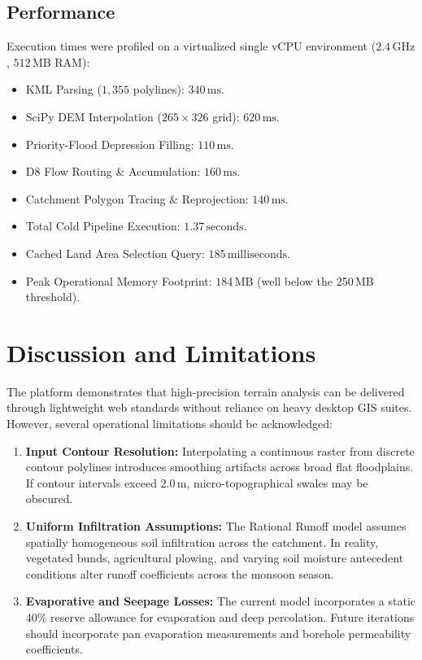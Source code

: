 \documentclass[manuscript,screen,review]{acmart}
\begin{document}
\subsection{Performance}
Execution times were profiled on a virtualized single vCPU environment ($2.4\,\text{GHz}$, $512\,\text{MB}$ RAM):
\begin{itemize}
    \item KML Parsing ($1,355$ polylines): $340\,\text{ms}$.
    \item SciPy DEM Interpolation ($265 \times 326$ grid): $620\,\text{ms}$.
    \item Priority-Flood Depression Filling: $110\,\text{ms}$.
    \item D8 Flow Routing \& Accumulation: $160\,\text{ms}$.
    \item Catchment Polygon Tracing \& Reprojection: $140\,\text{ms}$.
    \item Total Cold Pipeline Execution: $1.37\,\text{seconds}$.
    \item Cached Land Area Selection Query: $185\,\text{milliseconds}$.
    \item Peak Operational Memory Footprint: $184\,\text{MB}$ (well below the 250\,MB threshold).
\end{itemize}

\section{Discussion and Limitations}
\label{sec:discussion}
The platform demonstrates that high-precision terrain analysis can be delivered through lightweight web standards without reliance on heavy desktop GIS suites. However, several operational limitations should be acknowledged:
\begin{enumerate}
    \item \textbf{Input Contour Resolution:} Interpolating a continuous raster from discrete contour polylines introduces smoothing artifacts across broad flat floodplains. If contour intervals exceed 2.0\,m, micro-topographical swales may be obscured.
    \item \textbf{Uniform Infiltration Assumptions:} The Rational Runoff model assumes spatially homogeneous soil infiltration across the catchment. In reality, vegetated bunds, agricultural plowing, and varying soil moisture antecedent conditions alter runoff coefficients across the monsoon season.
    \item \textbf{Evaporative and Seepage Losses:} The current model incorporates a static 40\% reserve allowance for evaporation and deep percolation. Future iterations should incorporate pan evaporation measurements and borehole permeability coefficients.
\end{enumerate}
\end{document}
